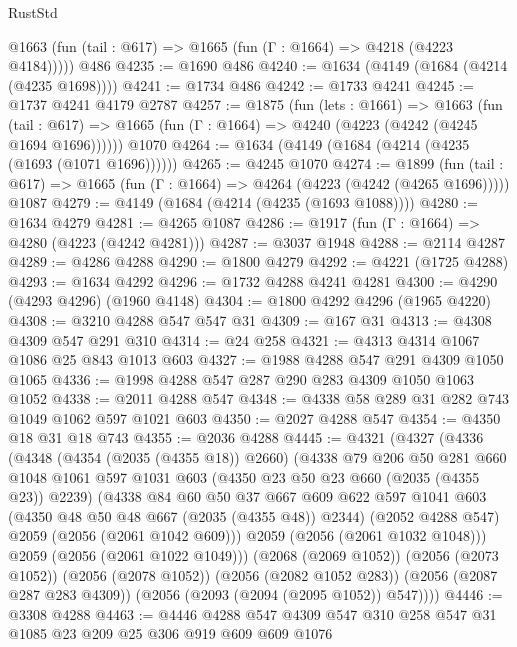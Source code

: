 \begin{lexlean}{RustStd}
\begin{coremodule}
      @1663 (fun (tail : @617) => @1665 (fun (Γ : @1664) => @4218 (@4223 @4184)))))
    @486
@4235 := @1690 @486
@4240 := @1634 (@4149 (@1684 (@4214 (@4235 @1698))))
@4241 := @1734 @486
@4242 := @1733 @4241
@4245 := @1737 @4241 @4179 @2787
@4257 := @1875
    (fun (lets : @1661) =>
    @1663
      (fun (tail : @617) => @1665 (fun (Γ : @1664) => @4240 (@4223 (@4242 (@4245 @1694 @1696))))))
    @1070
@4264 := @1634 (@4149 (@1684 (@4214 (@4235 (@1693 (@1071 @1696))))))
@4265 := @4245 @1070
@4274 := @1899
    (fun (tail : @617) => @1665 (fun (Γ : @1664) => @4264 (@4223 (@4242 (@4265 @1696)))))
    @1087
@4279 := @4149 (@1684 (@4214 (@4235 (@1693 @1088))))
@4280 := @1634 @4279
@4281 := @4265 @1087
@4286 := @1917 (fun (Γ : @1664) => @4280 (@4223 (@4242 @4281)))
@4287 := @3037 @1948
@4288 := @2114 @4287
@4289 := @4286 @4288
@4290 := @1800 @4279
@4292 := @4221 (@1725 @4288)
@4293 := @1634 @4292
@4296 := @1732 @4288 @4241 @4281
@4300 := @4290 (@4293 @4296) (@1960 @4148)
@4304 := @1800 @4292 @4296 (@1965 @4220)
@4308 := @3210 @4288 @547 @547 @31
@4309 := @167 @31
@4313 := @4308 @4309 @547 @291 @310
@4314 := @24 @258
@4321 := @4313 @4314 @1067 @1086 @25 @843 @1013 @603
@4327 := @1988 @4288 @547 @291 @4309 @1050 @1065
@4336 := @1998 @4288 @547 @287 @290 @283 @4309 @1050 @1063 @1052
@4338 := @2011 @4288 @547
@4348 := @4338 @58 @289 @31 @282 @743 @1049 @1062 @597 @1021 @603
@4350 := @2027 @4288 @547
@4354 := @4350 @18 @31 @18 @743
@4355 := @2036 @4288
@4445 := @4321
    (@4327
      (@4336
        (@4348
          (@4354 (@2035 (@4355 @18)) @2660)
          (@4338
            @79
            @206
            @50
            @281
            @660
            @1048
            @1061
            @597
            @1031
            @603
            (@4350 @23 @50 @23 @660 (@2035 (@4355 @23)) @2239)
            (@4338
              @84
              @60
              @50
              @37
              @667
              @609
              @622
              @597
              @1041
              @603
              (@4350 @48 @50 @48 @667 (@2035 (@4355 @48)) @2344)
              (@2052 @4288 @547)
              @2059
              (@2056 (@2061 @1042 @609)))
            @2059
            (@2056 (@2061 @1032 @1048)))
          @2059
          (@2056 (@2061 @1022 @1049)))
        (@2068 (@2069 @1052))
        (@2056 (@2073 @1052))
        (@2056 (@2078 @1052))
        (@2056 (@2082 @1052 @283))
        (@2056 (@2087 @287 @283 @4309))
        (@2056 (@2093 (@2094 (@2095 @1052)) @547))))
@4446 := @3308 @4288
@4463 := @4446 @4288 @547 @4309 @547 @310 @258 @547 @31 @1085 @23 @209 @25 @306 @919 @609 @609 @1076

\end{coremodule}
\end{lexlean}
